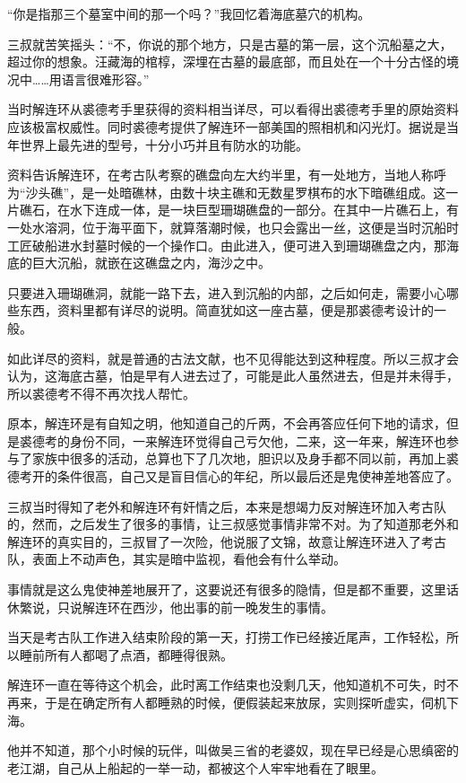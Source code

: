 “你是指那三个墓室中间的那一个吗？”我回忆着海底墓穴的机构。

三叔就苦笑摇头：“不，你说的那个地方，只是古墓的第一层，这个沉船墓之大，超过你的想象。汪藏海的棺椁，深埋在古墓的最底部，而且处在一个十分古怪的境况中……用语言很难形容。”

当时解连环从裘德考手里获得的资料相当详尽，可以看得出裘德考手里的原始资料应该极富权威性。同时裘德考提供了解连环一部美国的照相机和闪光灯。据说是当年世界上最先进的型号，十分小巧并且有防水的功能。

资料告诉解连环，在考古队考察的礁盘向左大约半里，有一处地方，当地人称呼为“沙头礁”，是一处暗礁林，由数十块主礁和无数星罗棋布的水下暗礁组成。这一片礁石，在水下连成一体，是一块巨型珊瑚礁盘的一部分。在其中一片礁石上，有一处水溶洞，位于海平面下，就算落潮时候，也只会露出一丝，这便是当时沉船时工匠破船进水封墓时候的一个操作口。由此进入，便可进入到珊瑚礁盘之内，那海底的巨大沉船，就嵌在这礁盘之内，海沙之中。

只要进入珊瑚礁洞，就能一路下去，进入到沉船的内部，之后如何走，需要小心哪些东西，资料里都有详尽的说明。简直犹如这一座古墓，便是那裘德考设计的一般。

如此详尽的资料，就是普通的古法文献，也不见得能达到这种程度。所以三叔才会认为，这海底古墓，怕是早有人进去过了，可能是此人虽然进去，但是并未得手，所以裘德考不得不再次找人帮忙。

原本，解连环是有自知之明，他知道自己的斤两，不会再答应任何下地的请求，但是裘德考的身份不同，一来解连环觉得自己亏欠他，二来，这一年来，解连环也参与了家族中很多的活动，总算也下了几次地，胆识以及身手都不同以前，再加上裘德考开的条件很高，自己又是盲目信心的年纪，所以最后还是鬼使神差地答应了。

三叔当时得知了老外和解连环有奸情之后，本来是想竭力反对解连环加入考古队的，然而，之后发生了很多的事情，让三叔感觉事情非常不对。为了知道那老外和解连环的真实目的，三叔冒了一次险，他说服了文锦，故意让解连环进入了考古队，表面上不动声色，其实是暗中监视，看他会有什么举动。

事情就是这么鬼使神差地展开了，这要说还有很多的隐情，但是都不重要，这里话休繁说，只说解连环在西沙，他出事的前一晚发生的事情。

当天是考古队工作进入结束阶段的第一天，打捞工作已经接近尾声，工作轻松，所以睡前所有人都喝了点酒，都睡得很熟。

解连环一直在等待这个机会，此时离工作结束也没剩几天，他知道机不可失，时不再来，于是在确定所有人都睡熟的时候，便假装起来放尿，实则探听虚实，伺机下海。

他并不知道，那个小时候的玩伴，叫做吴三省的老婆奴，现在早已经是心思缜密的老江湖，自己从上船起的一举一动，都被这个人牢牢地看在了眼里。


